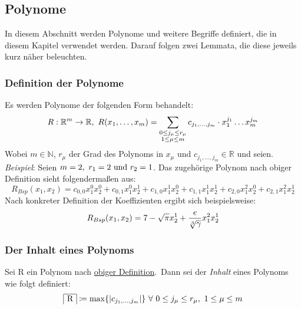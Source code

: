 
\subsection{Polynome}
    \label{subsec:polynomials}
    \textrm{In diesem Abschnitt werden Polynome und weitere Begriffe definiert, die in diesem Kapitel verwendet werden.
    Darauf folgen zwei Lemmata, die diese jeweils kurz näher beleuchten.}
    
    \subsubsection{Definition der Polynome}
        \label{subsubsec:def-poly}
        Es werden Polynome der folgenden Form behandelt:
        \begin{equation}
            R : \mathbb{R}^m \rightarrow \mathbb{R},\
            R(x_1, \dots, x_m) = \sum_{\substack{0 \leq j_\mu \leq r_\mu \\ 1 \leq \mu \leq m}}
            c_{j_1, \dots, j_m} \cdot x_1^{j_1} \dots x_m^{j_m} \label{eq:def-poly}
        \end{equation}
        Wobei $m \in \mathbb{N}$, $r_\mu$ der Grad des Polynoms in $x_\mu$ und $c_{j_1, \dots, j_m} \in
        \mathbb{R}$ und seien.
        \newline \newline
        \emph{Beispiel}: Seien $m = 2,\ r_1 = 2 \ \textrm{und}\  r_2 = 1$.
        \newline
        \textrm{Das zugehörige Polynom nach obiger Definition sieht folgendermaßen aus:}
        \begin{equation*}
            R_{Bsp}(x_1, x_2) = c_{0,0} x_1^0 x_2^0 + c_{0,1} x_1^0 x_2^1 + c_{1,0} x_1^1 x_2^0 + c_{1,1} x_1^1
            x_2^1 + c_{2, 0} x_1^2 x_2^0 + c_{2,1} x_1^2 x_2^1
        \end{equation*}
        Nach konkreter Definition der Koeffizienten ergibt sich beispielsweise:
        \begin{equation*}
            R_{Bsp}(x_1, x_2) = 7 - \sqrt{\pi} x_2^1 + \frac{e}{\sqrt[3]{\gamma}} x_1^2 x_2^1
        \end{equation*}
    
    \subsubsection{Der Inhalt eines Polynoms}
        \label{subsubsec:def-content}
        Sei R ein Polynom nach \hyperref[subsubsec:def-poly]{obiger Definition}.\ Dann sei der \emph{Inhalt} eines
        Polynoms wie folgt definiert:
        \begin{equation}
            \content{R} \coloneq \max\{|c_{\enum{j_1}{j_m}}| \} \  \forall \  0 \leq j_\mu \leq r_\mu, \
            1 \leq \mu \leq m \label{eq:def-content}
        \end{equation}
    

